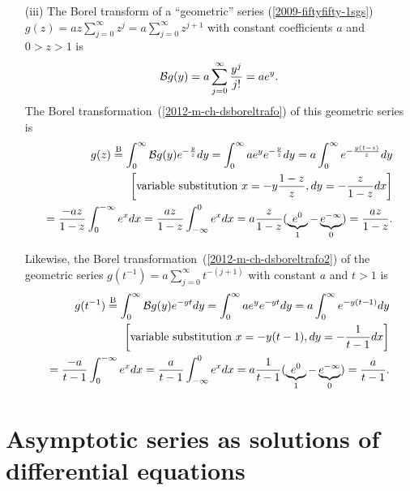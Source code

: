 {\begin{itemize}
\item[(iii)]
The Borel transform
of a ``geometric'' series (\ref{2009-fiftyfifty-1sgs})
$g(z)=a z \sum_{j=0}^\infty    z^{j}=a \sum_{j=0}^\infty    z^{j+1}$ with constant
coefficients $a$ and $0> z > 1$
is
\begin{equation}
{\cal B}g (y)
=
a \sum_{j=0}^\infty   \frac{y^j}{j!} = a e^y.
\end{equation}
The Borel transformation~(\ref{2012-m-ch-dsboreltrafo}) of this geometric series  is
\begin{equation}
\begin{split}
g(z) \stackrel{{\rm B}}{=} \int_0^\infty {\cal B}g (y)   e^{-\frac{y}{z}}   dy
=
\int_0^\infty a e^y  e^{-\frac{y}{z}}   dy
=
a \int_0^\infty e^{-\frac{y(1-z)}{z}}   dy  \\
\left[\textrm{variable substitution } x =  -y\frac{1-z}{z}, dy = -\frac{z}{1-z} dx \right]\\
=
\frac{-a z}{1-z} \int_0^{-\infty} e^{x}   dx
=
\frac{a z}{1-z} \int_{-\infty}^0 e^{x}   dx
=
a \frac{z}{1-z} (\underbrace{e^0}_{1}-\underbrace{e^{-\infty}}_{0})    =  \frac{a z}{1-z}.
\end{split}
\end{equation}

Likewise, the Borel transformation~(\ref{2012-m-ch-dsboreltrafo2})
of the geometric series
$g(t^{-1})=a   \sum_{j=0}^\infty    t^{-(j+1)}$ with constant $a$ and $t > 1$
is
\begin{equation}
\begin{split}
g(t^{-1}) \stackrel{{\rm B}}{=} \int_0^\infty {\cal B}g (y)   e^{-yt}   dy
=
\int_0^\infty a e^y  e^{-yt}   dy
=
a \int_0^\infty e^{- y(t-1) }   dy  \\
\left[\textrm{variable substitution } x =  - y(t-1) , dy = -\frac{1}{t-1} dx \right]\\
=
\frac{-a}{t-1} \int_0^{-\infty} e^{x}   dx
=
\frac{a }{t-1} \int_{-\infty}^0 e^{x}   dx
=
a \frac{1}{t-1} (\underbrace{e^0}_{1}-\underbrace{e^{-\infty}}_{0})    =  \frac{a }{t-1}.
\end{split}
\end{equation}


\end{itemize}
\eexample
}


\section{Asymptotic series as solutions of differential equations}
\label{2019-mm-ch-ds-rsdg}


